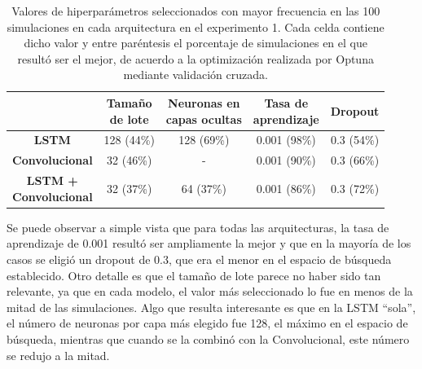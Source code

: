 \documentclass[../../main.tex]{subfiles}
\begin{document}
\begin{table}[H]
    \centering
    \renewcommand{\arraystretch}{1.2}
    \begin{tabular}{|c|c|c|c|c|}
        \hline
            & \makecell{\textbf{Tamaño}\\\textbf{de lote}}
            & \makecell{\textbf{Neuronas en}\\\textbf{capas ocultas}}
            & \makecell{\textbf{Tasa de}\\\textbf{aprendizaje}}
            & \textbf{Dropout} \\ \hline\hline
        \textbf{LSTM}
            & 128 (44\%) & 128 (69\%) & 0.001 (98\%) & 0.3 (54\%) \\ \hline
        \textbf{Convolucional}
            & 32 (46\%)  & -          & 0.001 (90\%) & 0.3 (66\%) \\ \hline
        \makecell{\textbf{LSTM +}\\\textbf{Convolucional}}
            & 32 (37\%)  & 64 (37\%)  & 0.001 (86\%) & 0.3 (72\%) \\
        \hline
    \end{tabular}
    \caption{Valores de hiperparámetros seleccionados con mayor frecuencia en las 100
    simulaciones en cada arquitectura en el experimento 1. Cada celda contiene dicho valor
    y entre paréntesis el porcentaje de simulaciones en el que resultó ser el mejor, de
    acuerdo a la optimización realizada por Optuna mediante validación cruzada.}
    \label{tab:hyperparams_exp1}
\end{table}

Se puede observar a simple vista que para todas las arquitecturas, la tasa de aprendizaje
de 0.001 resultó ser ampliamente la mejor y que en la mayoría de los casos se eligió un
dropout de 0.3, que era el menor en el espacio de búsqueda establecido. Otro detalle
es que el tamaño de lote parece no haber sido tan relevante, ya que en cada modelo, el
valor más seleccionado lo fue en menos de la mitad de las simulaciones. Algo que resulta
interesante es que en la LSTM ``sola'', el número de neuronas por capa más elegido fue
128, el máximo en el espacio de búsqueda, mientras que cuando se la combinó con la
Convolucional, este número se redujo a la mitad.
\end{document}

